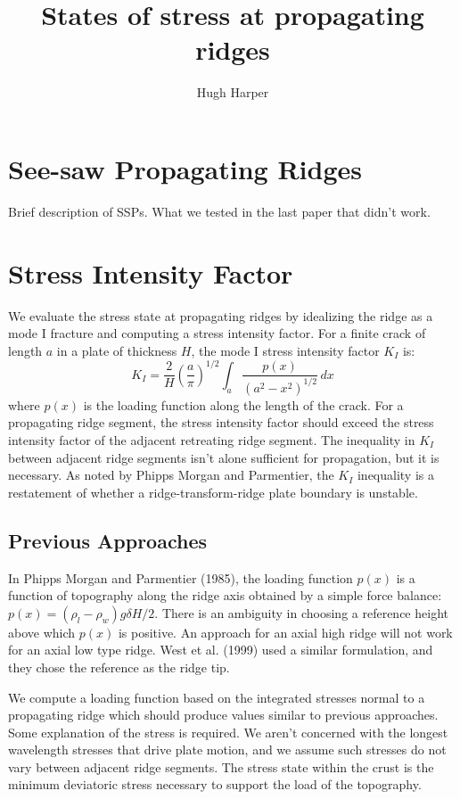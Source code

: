 \documentclass{article}
\author{Hugh Harper}
\title{States of stress at propagating ridges}
\begin{document}
\maketitle
\section{See-saw Propagating Ridges}
Brief description of SSPs. What we tested in the last paper that didn't work.

\section{Stress Intensity Factor}
We evaluate the stress state at propagating ridges by idealizing the ridge as a mode I fracture and computing a stress intensity factor. For a finite crack of length $a$ in a plate of thickness $H$, the mode I stress intensity factor $K_I$ is:
\begin{equation}
	K_I = \frac{2}{H}\left(\frac{a}{\pi}\right)^{1/2}\int_a \frac{p\left(x\right)}{\left(a^2 - x^2 \right)^{1/2}}\, dx
\end{equation}
where $p(x)$ is the loading function along the length of the crack. For a propagating ridge segment, the stress intensity factor should exceed the stress intensity factor of the adjacent retreating ridge segment. The inequality in $K_I$ between adjacent ridge segments isn't alone sufficient for propagation, but it is necessary. As noted by Phipps Morgan and Parmentier, the $K_I$ inequality is a restatement of whether a ridge-transform-ridge plate boundary is unstable.

\subsection{Previous Approaches}
In Phipps Morgan and Parmentier (1985), the loading function $p(x)$ is a function of topography along the ridge axis obtained by a simple force balance: $p(x) = (\rho_l - \rho_w)g\delta H/2 $. There is an ambiguity in choosing a reference height above which $p(x)$ is positive. An approach for an axial high ridge will not work for an axial low type ridge. West et al. (1999) used a similar formulation, and they chose the reference as the ridge tip.

We compute a loading function based on the integrated stresses normal to a propagating ridge which should produce values similar to previous approaches. Some explanation of the stress is required. We aren't concerned with the longest wavelength stresses that drive plate motion, and we assume such stresses do not vary between adjacent ridge segments. The stress state within the crust is the minimum deviatoric stress necessary to support the load of the topography.
\end{document}
